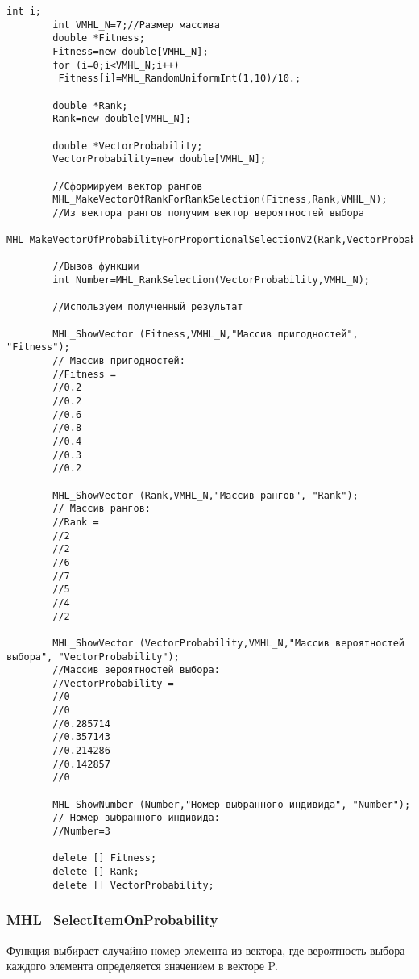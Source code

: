 \documentclass[a4paper,12pt]{article}
\begin{document}
\begin{lstlisting}[label=code_use_MHL_RankSelection,caption=Пример использования]
        int i;
        int VMHL_N=7;//Размер массива
        double *Fitness;
        Fitness=new double[VMHL_N];
        for (i=0;i<VMHL_N;i++)
         Fitness[i]=MHL_RandomUniformInt(1,10)/10.;

        double *Rank;
        Rank=new double[VMHL_N];

        double *VectorProbability;
        VectorProbability=new double[VMHL_N];

        //Сформируем вектор рангов
        MHL_MakeVectorOfRankForRankSelection(Fitness,Rank,VMHL_N);
        //Из вектора рангов получим вектор вероятностей выбора
        MHL_MakeVectorOfProbabilityForProportionalSelectionV2(Rank,VectorProbability,VMHL_N);

        //Вызов функции
        int Number=MHL_RankSelection(VectorProbability,VMHL_N);

        //Используем полученный результат

        MHL_ShowVector (Fitness,VMHL_N,"Массив пригодностей", "Fitness");
        // Массив пригодностей:
        //Fitness =	
        //0.2
        //0.2
        //0.6
        //0.8
        //0.4
        //0.3
        //0.2

        MHL_ShowVector (Rank,VMHL_N,"Массив рангов", "Rank");
        // Массив рангов:
        //Rank =	
        //2
        //2
        //6
        //7
        //5
        //4
        //2

        MHL_ShowVector (VectorProbability,VMHL_N,"Массив вероятностей выбора", "VectorProbability");
        //Массив вероятностей выбора:
        //VectorProbability =	
        //0
        //0
        //0.285714
        //0.357143
        //0.214286
        //0.142857
        //0

        MHL_ShowNumber (Number,"Номер выбранного индивида", "Number");
        // Номер выбранного индивида:
        //Number=3

        delete [] Fitness;
        delete [] Rank;
        delete [] VectorProbability;
\end{lstlisting}

\subsubsection{MHL\_SelectItemOnProbability}\label{MHL_SelectItemOnProbability}

Функция выбирает случайно номер элемента из вектора, где вероятность выбора каждого элемента определяется значением в векторе P.
\end{document}

